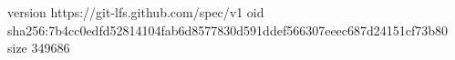 version https://git-lfs.github.com/spec/v1
oid sha256:7b4cc0edfd52814104fab6d8577830d591ddef566307eeec687d24151cf73b80
size 349686
